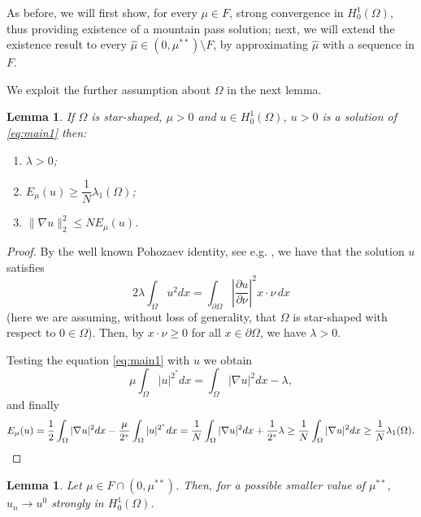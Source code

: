 \documentclass[10pt]{article}
\newtheorem{lemma}[proposition]{Lemma}
\theoremstyle{definition}
\numberwithin{equation}{section}
\begin{document}
As before, we will first show, for every $\mu\in F$, strong convergence in $H^1_0(\Omega)$,
thus providing existence of a mountain pass solution; next, we will extend the existence result
to every $\hat\mu \in (0,\mu^{**})\setminus F$, by approximating $\hat\mu$ with a sequence in $F$.

We exploit the further assumption about $\Omega$ in the next lemma.

\begin{lemma}\label{lem:conseq_Poho}
If $\Omega$ is star-shaped, $\mu>0$ and $u\in H^1_0(\Omega)$, $u>0$ is a solution of
\eqref{eq:main1} then:
\begin{enumerate}
\item $\lambda>0$;
\item $E_\mu(u) \ge \dfrac{1}{N} \lambda_1(\Omega)$;
\item $\|\nabla u\|_2^2 \le N E_\mu(u)$.
\end{enumerate}
\end{lemma}
%
\begin{proof}
By the well known Pohozaev identity, see e.g. \cite[Ch. III, Lemma 1.4]{Struwebook},
we have that the solution $u$ satisfies
\[
2\lambda\int_{\Omega}u^{2}dx= \int_{\partial\Omega}\left|\frac{\partial u}{\partial \nu}\right|^{2} x\cdot\nu \,dx
\]
(here we are assuming, without loss of generality, that $\Omega$ is star-shaped with respect
to $0\in\Omega$).
Then, by $x\cdot\nu\ge0$ for all $x\in\partial \Omega$, we have $\lambda>0$.

Testing the equation \eqref{eq:main1} with $u$ we obtain
\[
\mu\int_{\Omega}|u|^{2^{*}}dx = \int_{\Omega}|\nabla u|^{2}dx - \lambda,
\]
and finally
\[
E_\mu(u) = \frac12 \int_{\Omega}|\nabla u|^{2}dx-\frac{\mu}{2^{*}}\int_{\Omega}|u|^{2^{*}}dx =
\frac1N \int_{\Omega}|\nabla u|^{2}dx+ \frac{1}{2^{*}}\lambda \ge \frac1N \int_{\Omega}|\nabla u|^{2}dx
\ge \frac1N \lambda_1(\Omega). \qedhere
\]
\end{proof}



\begin{lemma}\label{lem:strongconv_final}
Let $\mu\in F \cap (0,\mu^{**})$. Then, for a
possible smaller value of $\mu^{**}$, $u_n \to u^0$ strongly in $H^1_0(\Omega)$.
\end{lemma}
\end{document}
